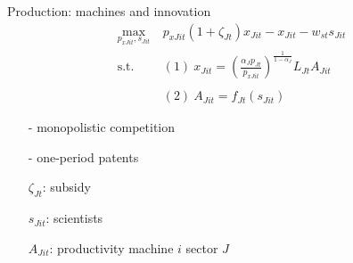\documentclass[11pt,aspectratio=169]{beamer}
\begin{document}
\begin{frame}{Production: machines and innovation}
	\vspace{-8mm}
	\begin{align*}
		\underset{p_{xJit}, s_{Jit}}{\max}\ & p_{xJit}(1+\zeta_{Jt})x_{Jit}-x_{Jit}-w_{st}s_{Jit}
		\\ 
		\text{s.t.}\ &(1)\ x_{Jit}=\left(\frac{\alpha_Jp_{Jt}}{p_{xJit}}\right)^{\frac{1}{1-\alpha_J}}L_{Jt}A_{Jit}\\ \ \\ %
		& (2)\ A_{Jit}=f_{Jt}(s_{Jit})%
	\end{align*}
	
	\small
	\vspace{4mm}
	\hspace{-4mm}	\begin{minipage}[t!]{0.32\textwidth}
		\vspace{0mm}
		\begin{itemize}
			\item[-] monopolistic competition 
			\vspace{-4mm}
			\item[-] one-period patents
		\end{itemize}	
	\end{minipage}
	\begin{minipage}[t!]{0.5\textwidth}
		\vspace{0mm}
		\begin{itemize}	
			\item[]$\zeta_{Jt}$: subsidy
			\vspace{-2mm}	
			\item[]$s_{Jit}$: scientists
			\vspace{-2mm}	
			\item[]$A_{Jit}$: productivity machine $i$ sector $J$
		\end{itemize}
	\end{minipage}
\end{frame}
\end{document}
